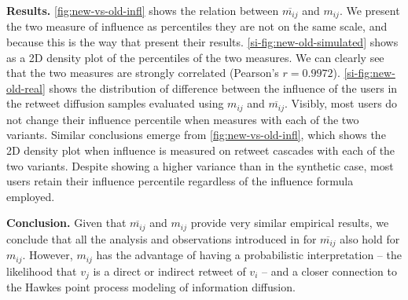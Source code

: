 \textbf{Results.}
\cref{fig:new-vs-old-infl} shows the relation between $\overline{m_{ij}}$ and $m_{ij}$.
We present the two measure of influence as percentiles they are not on the same scale, and because this is the way that \citet{Rizoiu2018a} present their results.
\cref{si-fig:new-old-simulated} shows as a 2D density plot of the percentiles of the two measures.
We can clearly see that the two measures are strongly correlated (Pearson's $r = 0.9972$).
\cref{si-fig:new-old-real} shows the distribution of difference between the influence of the users in the retweet diffusion samples evaluated using $m_{ij}$ and $\overline{m_{ij}}$.
Visibly, most users do not change their influence percentile when measures with each of the two variants.
Similar conclusions emerge from \cref{fig:new-vs-old-infl}, which shows the 2D density plot when influence is measured on retweet cascades with each of the two variants.
Despite showing a higher variance than in the synthetic case, most users retain their influence percentile regardless of the influence formula employed.

\textbf{Conclusion.}
Given that $\overline{m_{ij}}$ and $m_{ij}$ provide very similar empirical results, we conclude that all the analysis and observations introduced in \citep{Rizoiu2018a} for $\overline{m_{ij}}$ also hold for $m_{ij}$.
However, $m_{ij}$ has the advantage of having a probabilistic interpretation -- the likelihood that $v_j$ is a direct or indirect retweet of $v_i$ -- and a closer connection to the Hawkes point process modeling of information diffusion.
